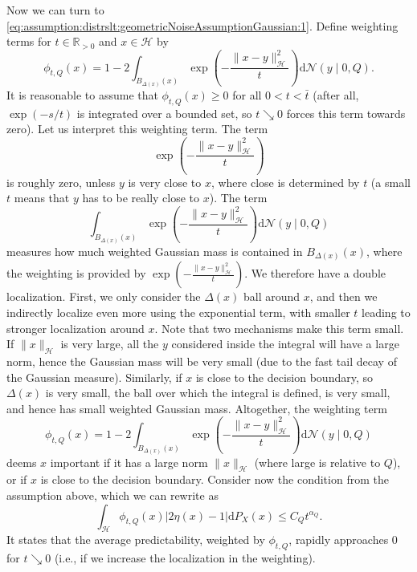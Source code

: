 \documentclass[letterpaper]{article} %
\newcommand{\R}{\mathbb{R}}
\newcommand{\Rp}{\R_{> 0}}
\newcommand{\hs}[1]{\mathcal{#1}} %
\newcommand{\Normal}{\mathcal{N}}
\begin{document}
Now we can turn to \eqref{eq:assumption:distrslt:geometricNoiseAssumptionGaussian:1}.
Define weighting terms for $t\in\Rp$ and $x\in\hs{H}$ by
\begin{equation}
    \phi_{t,Q}(x) = 1- 2\int_{B_{\Delta(x)}(x)}
            \exp\left(-\frac{\|x-y\|_\hs{H}^2}{t}\right)
            \mathrm{d} \Normal(y\mid 0,Q).
\end{equation}
It is reasonable to assume that $\phi_{t,Q}(x)\geq 0$ for all $0< t < \bar t$ (after all, $\exp(-s/t)$ is integrated over a bounded set, so $t \searrow 0$ forces this term towards zero).
Let us interpret this weighting term.
The term
\begin{equation*}
    \exp\left(-\frac{\|x-y\|_\hs{H}^2}{t}\right)
\end{equation*}
is roughly zero, unless $y$ is very close to $x$, where close is determined by $t$ (a small $t$ means that $y$ has to be really close to $x$).
The term
\begin{equation*}
    \int_{B_{\Delta(x)}(x)}\exp\left(-\frac{\|x-y\|_\hs{H}^2}{t}\right)\mathrm{d} \Normal(y\mid 0,Q)
\end{equation*}
measures how much weighted Gaussian mass is contained in $B_{\Delta(x)}(x)$, where the weighting is provided by $ \exp\left(-\frac{\|x-y\|_\hs{H}^2}{t}\right)$.
We therefore have a double localization. 
First, we only consider the $\Delta(x)$ ball around $x$, and then we indirectly localize even more using the exponential term, with smaller $t$ leading to stronger localization around $x$.
Note that two mechanisms make this term small. If $\|x\|_\hs{H}$ is very large, all the $y$ considered inside the integral will have a large norm, hence the Gaussian mass will be very small (due to the fast tail decay of the Gaussian measure).
Similarly, if $x$ is close to the decision boundary, so $\Delta(x)$ is very small, the ball over which the integral is defined, is very small, and hence has small weighted Gaussian mass.
Altogether, the weighting term
\begin{equation*}
    \phi_{t,Q}(x) = 1- 2\int_{B_{\Delta(x)}(x)}
            \exp\left(-\frac{\|x-y\|_\hs{H}^2}{t}\right)
            \mathrm{d} \Normal(y\mid 0,Q)
\end{equation*}
deems $x$ important if it has a large norm $\|x\|_\hs{H}$ (where large is relative to $Q$),
or if $x$ is close to the decision boundary.
Consider now the condition from the assumption above, which we can rewrite as 
\begin{equation*}
     \int_\hs{H} \phi_{t,Q}(x) |2\eta(x)-1|\mathrm{d}P_X(x) \leq C_Q t^{\alpha_Q}.
\end{equation*}
It states that the average predictability, weighted by $\phi_{t,Q}$, rapidly approaches 0 for $t \searrow 0$ (i.e., if we increase the localization in the weighting).
\end{document}
